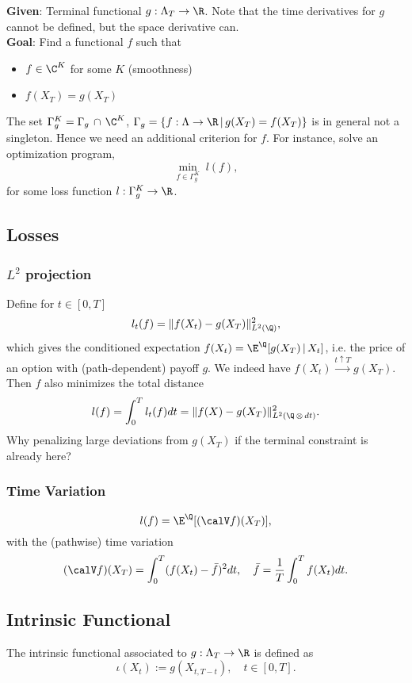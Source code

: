
\textbf{Given}: Terminal functional $g:\Lambda_T \to \R$. Note that the time derivatives for $g$ cannot be defined, but the space derivative can. 
\\
\textbf{Goal}: Find a functional $f$ such that
\begin{itemize}
    \item $f\in \C^K$ for some $K$ (smoothness)
    \item $f(X_T) = g(X_T) $
\end{itemize}
The set $\Gamma^K_g = \Gamma_g \, \cap \, \C^K$, $\Gamma_g = \{f:\Lambda \to \R \, |\, g(X_T) = f(X_T) \}$ is in general not a singleton. Hence we need an additional criterion for $f$.  For instance, solve an optimization program,
$$\min_{f \in \Gamma^K_g} \; l( f),$$
for some loss function $l: \Gamma^K_{g} \to \R$. 
\subsection{Losses}
\subsubsection{$L^2$ projection }
Define for $t\in [0,T]$
$$ l_t(f) = \lVert f(X_t) - g(X_T) \rVert_{L^2(\Q)}^2, $$
which gives the conditioned expectation $f(X_t) = \E^{\Q}[g(X_T) \, |\, X_t]$, i.e. the price of an option with (path-dependent) payoff $g$. We indeed have $f(X_t) \overset{t\uparrow T}{\longrightarrow} g(X_T)$. Then $f$ also minimizes the total distance
$$l(f) = \int_0^T l_t(f)dt = \lVert f(X) - g(X_T) \rVert_{L^2(\Q\, \otimes \,dt)}^2. $$
Why penalizing large deviations from $g(X_T)$ if the terminal constraint is already here?

\subsubsection{Time Variation}
$$l(f) = \E^{\Q}[(\calV f)(X_T)],$$
with the (pathwise) time variation
$$(\calV f)(X_T) = \int_0^T (f(X_t) - \bar{f})^2 dt, \quad \bar{f} = \frac{1}{T} \int_0^T f(X_t)dt. $$

\subsection{Intrinsic Functional}
\begin{definition}
    The intrinsic functional associated to $g:\Lambda_T \to \R$ is defined as $$\iota(X_t) := g(X_{t,T-t}),\quad t\in [0,T].$$
\end{definition}

